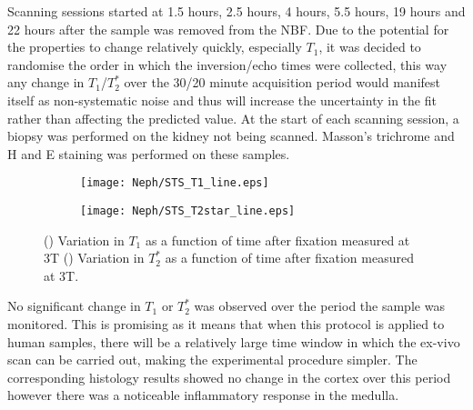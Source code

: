 Scanning sessions started at 1.5 hours, 2.5 hours, 4 hours, 5.5 hours, 19 hours and 22 hours after the sample was removed from the \ac{NBF}. Due to the potential for the properties to change relatively quickly, especially $T_1$, it was decided to randomise the order in which the inversion/echo times were collected, this way any change in $T_1$/$T_2^*$ over the 30/20 minute acquisition period would manifest itself as non-systematic noise and thus will increase the uncertainty in the fit rather than affecting the predicted value. At the start of each scanning session, a biopsy was performed on the kidney not being scanned. Masson's trichrome and \ac{H and E} staining was performed on these samples.\\

\begin{figure}[H]
	\centering
	\begin{subfigure}[c]{0.47\textwidth}
		\centering
		\texttt{[image: Neph/STS\_T1\_line.eps]}
		\caption{}
		\label{fig:fixation_t1_3t_sts}
	\end{subfigure}
	\hfill
	\begin{subfigure}[c]{0.47\textwidth}
		\centering
		\texttt{[image: Neph/STS\_T2star\_line.eps]}
		\caption{}
		\label{fig:fixation_t2star_3t_sts}
	\end{subfigure}
	\caption{() Variation in $T_1$ as a function of time after fixation measured at 3T () Variation in $T_2^*$ as a function of time after fixation measured at 3T.}
	\label{fig:fixation_sts}
\end{figure}

No significant change in $T_1$ or $T_2^*$ was observed over the period the sample was monitored. This is promising as it means that when this protocol is applied to human samples, there will be a relatively large time window in which the ex-vivo scan can be carried out, making the experimental procedure simpler. The corresponding histology results showed no change in the cortex over this period however there was a noticeable inflammatory response in the medulla.\\

